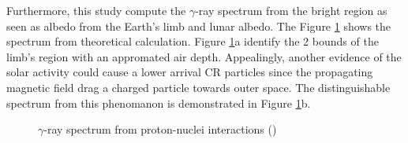 Furthermore, this study compute the $\gamma$-ray spectrum from 
the bright region as seen as albedo from the Earth's limb and 
lunar albedo. The Figure \ref{fig:gamma_spectrum_earth_lunar} 
shows the spectrum from theoretical calculation. Figure \ref{fig:gamma_spectrum_earth_lunar}a
identify the 2 bounds of the limb's region with an appromated air depth.
Appealingly, another evidence of the solar activity could cause 
a lower arrival CR particles since the propagating magnetic field 
drag a charged particle towards outer space. The distinguishable
spectrum from this phenomanon is demonstrated in
Figure \ref{fig:gamma_spectrum_earth_lunar}b.


\begin{figure}[h]
    \centering
        \hfill
        \caption{
            $\gamma$-ray spectrum from proton-nuclei interactions
            (\cite{Morris84})
        }
       \label{fig:gamma_spectrum_earth_lunar}
\end{figure}


